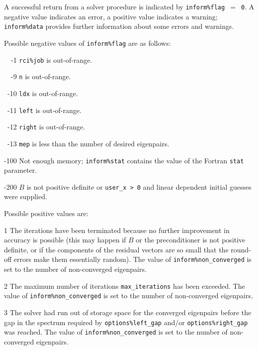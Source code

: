 \label{ssmfe:errors}

A successful return from 
a solver procedure
is indicated 
by {\tt inform\%flag $=$ 0}.
A negative value indicates an error, a positive value indicates a warning;
{\tt inform\%data} provides further information
about some errors and warnings. 

\noindent
Possible negative values of {\tt inform\%flag}
are as follows:
%
\begin{description}
%
\item{~~-1}
\hskip 9pt
{\tt rci\%job}  is out-of-range.
%
\item{~~-9}
\hskip 7pt
{\tt n} is out-of-range.
%
\item{~-10}
\hskip 7pt
{\tt ldx} is out-of-range.
%
\item{~-11}
\hskip 7pt
{\tt left} is out-of-range.
%
\item{~-12}
\hskip 7pt
{\tt right} is out-of-range.
%
\item{~-13}
\hskip 7pt
{\tt mep} is less than 
the number of desired eigenpairs.
%
\item{-100}
\hskip 4pt
Not enough memory;
{\tt inform\%stat} contains the value of the Fortran {\tt stat} parameter.
%
\item{-200}
\hskip 4pt
$B$ is not positive definite or {\tt user\_x > 0} and
linear dependent initial guesses were supplied.
%
\end{description}

\noindent
Possible positive values  are: 
%
\begin{description}
\item{1}
\hskip 9pt
The iterations have been terminated because no further improvement
in accuracy is possible (this may happen if $B$ or the preconditioner is
not positive definite, or if the components of the residual vectors
are so small that the round-off
errors make them essentially random).
The value of {\tt inform\%non\_converged} is set to the number
of non-converged eigenpairs.
\item{2}
\hskip 9pt
The maximum number of iterations {\tt max\_iterations} has been exceeded.
The value of {\tt inform\%non\_converged} is set to the number
of non-converged eigenpairs.
\item{3}
\hskip 9pt
The solver had run
out of storage space for the converged eigenpairs
before the gap in the spectrum 
required by {\tt options\%left\_gap} and/or {\tt options\%right\_gap}
was reached.
The value of {\tt inform\%non\_converged} is set to the number
of non-converged eigenpairs.
%
\end{description}

